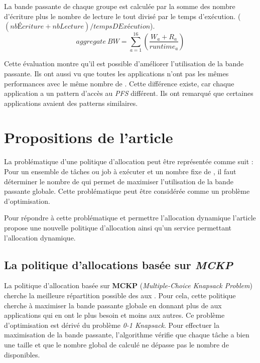 \documentclass[10pt, a4paper]{article}
\begin{document}
La bande passante de chaque groupe est calculée par la somme des nombre d'écriture plus le nombre de lecture le tout divisé par le temps d'exécution. ($(nbÉcriture + nbLecture) / tempsDExécution$).
\begin{equation*}aggregate\ BW=\sum_{a=1}^{16}\left(\frac{W_{a}+R_{a}}{runtime_{a}}\right) \tag{2}\end{equation*}

Cette évaluation montre qu'il est possible d'améliorer l'utilisation de la bande passante.
Ils ont aussi vu que toutes les applications n'ont pas les mêmes performances avec le même nombre de \noeudsIO{}. Cette différence existe, car chaque application a un pattern d'accès au \emph{PFS} différent. Ils ont remarqué que certaines applications avaient des patterns similaires.

\section{Propositions de l'article}

La problématique d'une politique d'allocation peut être représentée comme suit :
Pour un ensemble de tâches ou job à exécuter et un nombre fixe de \noeudsIO{}, il faut déterminer le nombre de \noeudsIOforwarding{} qui permet de maximiser l'utilisation de la bande passante globale.
Cette problématique peut être considérée comme un problème d'optimisation.

Pour répondre à cette problématique et permettre l'allocation dynamique l'article propose une nouvelle politique d'allocation ainsi qu'un service permettant l'allocation dynamique.

\subsection{La politique d'allocations basée sur \emph{MCKP}}

La politique d'allocation basée sur \textbf{MCKP} (\emph{Multiple-Choice Knapsack Problem}) cherche la meilleure répartition possible des \noeudsIOforwarding{} aux \noeudsDeCalculs{}.
Pour cela, cette politique cherche à maximiser la bande passante globale en donnant plus de \noeudsIOforwarding{} aux applications qui en ont le plus besoin et moins aux autres. Ce problème d'optimisation est dérivé du problème \emph{0-1 Knapsack}.
Pour effectuer la maximisation de la bande passante, l'algorithme vérifie que chaque tâche a bien une taille et que le nombre global de \noeudsIOforwarding{} calculé ne dépasse pas le nombre de \noeudsIO{} disponibles.
\end{document}
